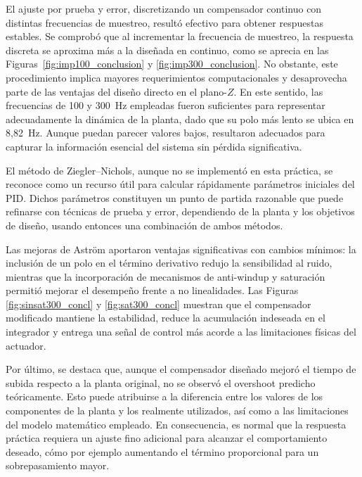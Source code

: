 El ajuste por prueba y error, discretizando un compensador continuo con distintas frecuencias de muestreo, resultó efectivo para obtener respuestas estables. Se comprobó que al incrementar la frecuencia de muestreo, la respuesta discreta se aproxima más a la diseñada en continuo, como se aprecia en las Figuras~\ref{fig:imp100_conclusion} y \ref{fig:imp300_conclusion}. No obstante, este procedimiento implica mayores requerimientos computacionales y desaprovecha parte de las ventajas del diseño directo en el plano-$Z$. En este sentido, las frecuencias de 100 y 300~Hz empleadas fueron suficientes para representar adecuadamente la dinámica de la planta, dado que su polo más lento se ubica en 8,82~Hz. Aunque puedan parecer valores bajos, resultaron adecuados para capturar la información esencial del sistema sin pérdida significativa.

El método de Ziegler--Nichols, aunque no se implementó en esta práctica, se reconoce como un recurso útil para calcular rápidamente parámetros iniciales del PID. Dichos parámetros constituyen un punto de partida razonable que puede refinarse con técnicas de prueba y error, dependiendo de la planta y los objetivos de diseño, usando entonces una combinación de ambos métodos.

Las mejoras de Astr\"om aportaron ventajas significativas con cambios mínimos: la inclusión de un polo en el término derivativo redujo la sensibilidad al ruido, mientras que la incorporación de mecanismos de anti-windup y saturación permitió mejorar el desempeño frente a no linealidades. Las Figuras \ref{fig:sinsat300_concl} y \ref{fig:sat300_concl} muestran que el compensador modificado mantiene la estabilidad, reduce la acumulación indeseada en el integrador y entrega una señal de control más acorde a las limitaciones físicas del actuador.

Por último, se destaca que, aunque el compensador diseñado mejoró el tiempo de subida respecto a la planta original, no se observó el overshoot predicho teóricamente. Esto puede atribuirse a la diferencia entre los valores de los componentes de la planta y los realmente utilizados, así como a las limitaciones del modelo matemático empleado. En consecuencia, es normal que la respuesta práctica requiera un ajuste fino adicional para alcanzar el comportamiento deseado, cómo por ejemplo aumentando el término proporcional para un sobrepasamiento mayor.

